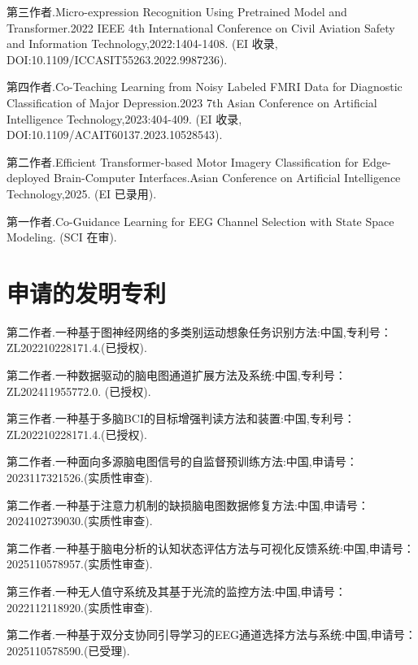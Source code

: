 \begin{resume}
\begin{enumerate}[label={[\arabic*]},labelsep=6pt,topsep=0pt,partopsep=0pt,
        parsep=0pt,itemsep=1pt,leftmargin=0em,itemindent=42pt]
          \item 第三作者.Micro-expression Recognition Using Pretrained Model and Transformer.2022 IEEE 4th International Conference on Civil Aviation Safety and Information Technology,2022:1404-1408. (EI 收录, DOI:10.1109/ICCASIT55263.2022.9987236).
          \item 第四作者.Co-Teaching Learning from Noisy Labeled FMRI Data for Diagnostic Classification of Major Depression.2023 7th Asian Conference on Artificial Intelligence Technology,2023:404-409. (EI 收录, DOI:10.1109/ACAIT60137.2023.10528543).
          \item 第二作者.Efficient Transformer-based Motor Imagery Classification for Edge-deployed Brain-Computer Interfaces.Asian Conference on Artificial Intelligence Technology,2025. (EI 已录用).
          \item 第一作者.Co-Guidance Learning for EEG Channel Selection with State Space Modeling. (SCI 在审).
          \end{enumerate}

          \section*{申请的发明专利} %
          \begin{enumerate}[label={[\arabic*]},labelsep=6pt,topsep=0pt,partopsep=0pt,
        parsep=0pt,itemsep=1pt,leftmargin=0em,itemindent=42pt]
          \item 第二作者.一种基于图神经网络的多类别运动想象任务识别方法:中国,专利号：ZL202210228171.4.(已授权).
          \item 第二作者.一种数据驱动的脑电图通道扩展方法及系统:中国,专利号：ZL202411955772.0. (已授权).
          \item 第三作者.一种基于多脑BCI的目标增强判读方法和装置:中国,专利号：ZL202210228171.4.(已授权).
          \item 第二作者.一种面向多源脑电图信号的自监督预训练方法:中国,申请号：2023117321526.(实质性审查).
          \item 第二作者.一种基于注意力机制的缺损脑电图数据修复方法:中国,申请号：2024102739030.(实质性审查).
          \item  第二作者.一种基于脑电分析的认知状态评估方法与可视化反馈系统:中国,申请号：2025110578957.(实质性审查).
          \item 第三作者.一种无人值守系统及其基于光流的监控方法:中国,申请号：2022112118920.(实质性审查).
          \item 第二作者.一种基于双分支协同引导学习的EEG通道选择方法与系统:中国,申请号：2025110578590.(已受理).
          \end{enumerate}


\end{resume}
